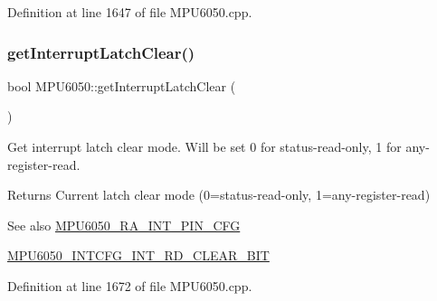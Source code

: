 Definition at line 1647 of file M\+P\+U6050.\+cpp.


\begin{DoxyCode}{0}

\end{DoxyCode}
\mbox{\label{classMPU6050_a9a098a607e20c64b60e155da35b8264f}} 
\subsubsection{\texorpdfstring{getInterruptLatchClear()}{getInterruptLatchClear()}}
{\footnotesize\ttfamily bool M\+P\+U6050\+::get\+Interrupt\+Latch\+Clear (\begin{DoxyParamCaption}{ }\end{DoxyParamCaption})}

Get interrupt latch clear mode. Will be set 0 for status-\/read-\/only, 1 for any-\/register-\/read. \begin{DoxyReturn}{Returns}
Current latch clear mode (0=status-\/read-\/only, 1=any-\/register-\/read) 
\end{DoxyReturn}
\begin{DoxySeeAlso}{See also}
\mbox{\hyperlink{MPU6050_8h_a82344e1daef2bac2e0d938319528be6c}{M\+P\+U6050\+\_\+\+R\+A\+\_\+\+I\+N\+T\+\_\+\+P\+I\+N\+\_\+\+C\+FG}} 

\mbox{\hyperlink{MPU6050_8h_a45b83ab5dc3f439636f6e5c591f1d5b1}{M\+P\+U6050\+\_\+\+I\+N\+T\+C\+F\+G\+\_\+\+I\+N\+T\+\_\+\+R\+D\+\_\+\+C\+L\+E\+A\+R\+\_\+\+B\+IT}} 
\end{DoxySeeAlso}


Definition at line 1672 of file M\+P\+U6050.\+cpp.


